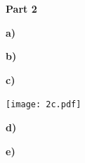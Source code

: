 \documentclass[12pt]{article}
\def\pp{\par\noindent}
\newcommand{\problem}[1]{\bigskip\pp\textbf{Part #1}\smallskip}
\renewcommand{\part}[1]{\smallskip\pp\textbf{#1)}\indent}
\begin{document}
\problem{2}
\part{a}

\part{b}

\part{c}

\pp\texttt{[image: 2c.pdf]}
\part{d}

\part{e}


\end{document}
